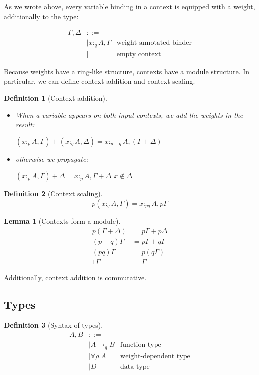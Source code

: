 \documentclass[11pt]{article}
\newtheorem{definition}{Definition}
\newtheorem{lemma}{Lemma}
\begin{document}
As we wrote above, every variable binding in a context is equipped
with a weight, additionally to the type:

\begin{align*}
  Γ,Δ & ::=\\
    & |  x :_q A, Γ & \text{weight-annotated binder} \\
    & |     & \text {empty context}
\end{align*}

Because weights have a ring-like structure, contexts have a module
structure. In particular, we can define context addition and context
scaling.

\begin{definition}[Context addition]~
\begin{itemize}
\item When a variable appears on both input contexts, we add the weights in
the result:

\((x :_p A,Γ) + (x :_q A,Δ) = x :_{p+q} A, (Γ+Δ)\)

\item otherwise we propagate:

\((x :_p A,Γ) + Δ = x :_p A, Γ+Δ\)   \hfill   \(x ∉ Δ\)
\end{itemize}
\end{definition}

\begin{definition}[Context scaling]
\begin{displaymath}
p(x :_q A, Γ) =  x :_{pq} A, pΓ
\end{displaymath}
\end{definition}

\begin{lemma}[Contexts form a module]
  \begin{align*}
  p  (Γ+Δ) &=p Γ+p Δ\\
 (p+q) Γ&=p Γ+q Γ \\
 (pq) Γ&=p (q Γ)\\
 1 Γ&=Γ
  \end{align*}
\end{lemma}

Additionally, context addition is commutative.
\subsection{Types}

\begin{definition}[Syntax of types]
\begin{align*}
  A,B &::=\\
      & |  A →_q B &\text{function type}\\
      & |  ∀ρ. A &\text{weight-dependent type}\\
      & |  D &\text{data type}
\end{align*}
\end{definition}
\end{document}
